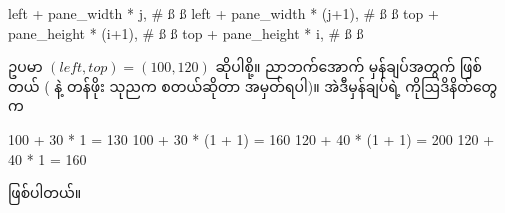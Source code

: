 \begin{py}
left + pane_width * j,          # ß ß
left + pane_width * (j+1),      # ß ß
top + pane_height * (i+1),      # ß ß
top + pane_height * i,          # ß ß
\end{py}
ဥပမာ $(left, top) = (100, 120)$ ဆိုပါစို့။ ညာဘက်အောက် မှန်ချပ်အတွက် \fEn{,}  ဖြစ်တယ် ( နဲ့   တန်ဖိုး သုညက စတယ်ဆိုတာ အမှတ်ရပါ)။ အဲဒီမှန်ချပ်ရဲ့ ကိုဩဒိနိတ်တွေက
\begin{codetxt}
100 + 30 * 1            = 130
100 + 30 * (1 + 1)      = 160 
120 + 40 * (1 + 1)      = 200
120 + 40 * 1            = 160
\end{codetxt}
ဖြစ်ပါတယ်။ 



